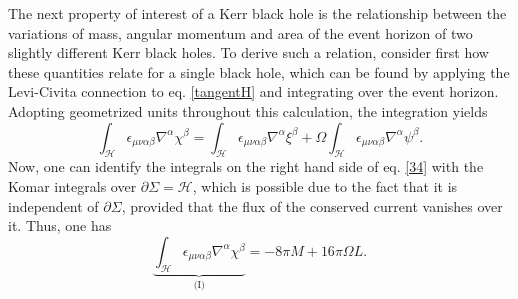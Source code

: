 \documentclass[
12pt,		%
openright,	%
twoside,  %
a4paper,			%
chapter=TITLE,		%
english,			%
french,				%
spanish,			%
brazil				%
]{USPSC-classe/USPSC}
\begin{document}
The next property of interest of a Kerr black hole is the relationship between the variations of mass, angular momentum and area of the event horizon of two slightly different Kerr black holes. To derive such a relation, consider first how these quantities relate for a single black hole, which can be found by applying the Levi-Civita connection to eq. \ref{tangentH} and integrating over the event horizon. Adopting geometrized units throughout this calculation, the integration yields
\begin{equation}\label{34}
    \int_{\mathscr{H}}\epsilon_{\mu\nu\alpha\beta}\nabla^{\alpha}\chi^{\beta}=\int_{\mathscr{H}}\epsilon_{\mu\nu\alpha\beta}\nabla^{\alpha}\xi^{\beta}+\Omega\int_{\mathscr{H}}\epsilon_{\mu\nu\alpha\beta}\nabla^{\alpha}\psi^{\beta}.
\end{equation}
Now, one can identify the integrals on the right hand side of eq. \ref{34} with the Komar integrals over $\partial\Sigma=\mathscr{H}$, which is possible due to the fact that it is independent of $\partial\Sigma$, provided that the flux of the conserved current vanishes over it. Thus, one has
\begin{equation}\label{mass2}
    \underbrace{\int_{\mathscr{H}}\epsilon_{\mu\nu\alpha\beta}\nabla^{\alpha}\chi^{\beta}}_{\text{(I)}}=-8\pi M+16\pi \Omega L.
\end{equation}
\end{document}

